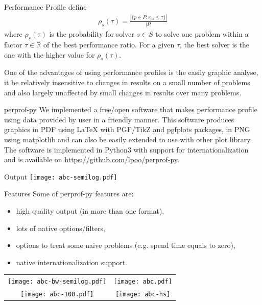 \documentclass[a0paper,portrait]{baposter}
\begin{document}
\begin{poster}
\begin{posterbox}[column=0,below=auto]{Performance Profile}
    \textcite{Dolan2001} define
    \begin{align*}
      \rho_s(\tau) = \frac{| \{p \in P: r_{ps} \leq \tau\} |}{| P |}
    \end{align*}
    where $\rho_s(\tau)$ is the probability for solver $s \in S$ to solve one
    problem within a factor $\tau \in \mathbb{R}$ of the best performance
    ratio. For a given $\tau$, the best solver is the one with the higher
    value for $\rho_s(\tau)$.

    One of the advantages of using performance profiles is the easily graphic
    analyse, it be relatively insensitive to changes in results on a small
    number of problems and also largely unaffected by small changes in
    results over many problems.
  \end{posterbox}

  \begin{posterbox}[column=0,below=auto]{perprof-py}
    We implemented a free/open software that makes performance profile using data
    provided by user in a friendly manner. This software produces graphics in PDF
    using LaTeX with PGF/TikZ and pgfplots packages,
    in PNG using matplotlib and can also be easily extended to
    use with other plot library. The software is implemented in Python3 with
    support for internationalization and is available on
    \url{https://github.com/lpoo/perprof-py}.
  \end{posterbox}

  \begin{posterbox}[column=0,below=auto,height=bottom]{Output}
    \texttt{[image: abc-semilog.pdf]}
  \end{posterbox}

  \begin{posterbox}[column=1]{Features}
    Some of perprof-py features are:
    \begin{itemize}
      \item high quality output (in more than one format),
      \item lots of native options/filters,
      \item options to treat some naive problems (e.g. spend time equals to zero),
      \item native internationalization support.
    \end{itemize}

    \begin{center}
      \begin{tabular}{cc}
        \texttt{[image: abc-bw-semilog.pdf]} &
        \texttt{[image: abc.pdf]} \\
        \texttt{[image: abc-100.pdf]} &
        \texttt{[image: abc-hs]}
      \end{tabular}
    \end{center}


\end{posterbox}
\end{poster}
\end{document}
